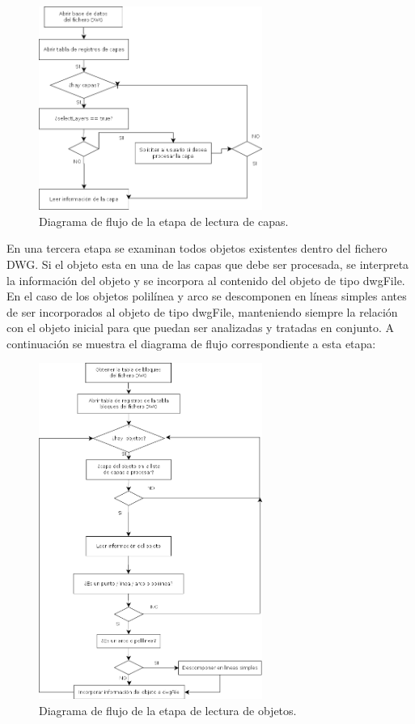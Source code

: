\begin{itemize}
{\begin{figure}[H]
\begin{center}
\includegraphics[width=0.65\textwidth]{imgs/diagramaFlujo2}
\caption{Diagrama de flujo de la etapa de lectura de capas.}
\end{center}
\end{figure}

En una tercera etapa se examinan todos objetos existentes dentro del fichero DWG. Si el objeto esta en una de las capas que debe ser procesada, se interpreta la información del objeto y se incorpora al contenido del objeto de tipo dwgFile. En el caso de los objetos polilínea y arco se descomponen en líneas simples antes de ser incorporados al objeto de tipo dwgFile, manteniendo siempre la relación con el objeto inicial para que puedan ser analizadas y tratadas en conjunto. A continuación se muestra el diagrama de flujo correspondiente a esta etapa:

\begin{figure}[H]
\begin{center}
\includegraphics[width=0.65\textwidth]{imgs/diagramaFlujo3}
\caption{Diagrama de flujo de la etapa de lectura de objetos.}
\end{center}
\end{figure}

}
\end{itemize}
